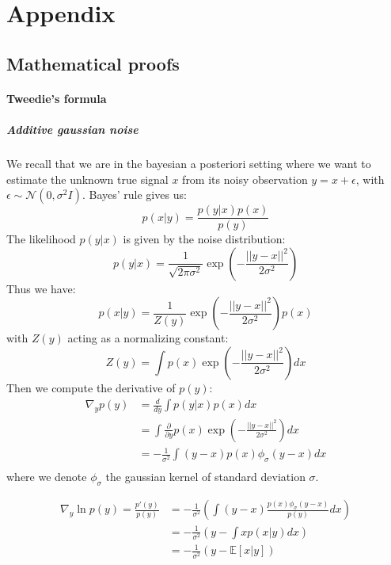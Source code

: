 \section{Appendix}

\subsection{Mathematical proofs}

\paragraph{Tweedie's formula}
\subparagraph{Additive gaussian noise}
We recall that we are in the bayesian a posteriori setting where we want to estimate the unknown true signal $x$ from its noisy observation $y = x + \epsilon$, with $\epsilon \sim \mathcal{N}(0, \sigma^2 I)$.
Bayes' rule gives us:
\begin{equation*}
    p(x|y) = \frac{p(y|x)p(x)}{p(y)}
\end{equation*}
The likelihood $p(y|x)$ is given by the noise distribution:
\begin{equation*}
    p(y|x) = \frac{1}{\sqrt{2 \pi \sigma^2}} \exp\left(-\frac{||y - x||^2}{2 \sigma^2}\right)
\end{equation*}
Thus we have:
\begin{equation*}
    p(x|y) = \frac{1}{Z(y)} \exp\left(-\frac{||y - x||^2}{2 \sigma^2}\right) p(x)
\end{equation*}
with $Z(y)$ acting as a normalizing constant:
\begin{equation*}
    Z(y) = \int p(x) \exp\left(-\frac{||y - x||^2}{2 \sigma^2}\right)dx
\end{equation*}
Then we compute the derivative of $p(y)$:
\begin{align*}
    \nabla_y p(y) &= \frac{d}{dy} \int p(y|x)p(x) dx \\
    &= \int \frac{\partial}{\partial y} p(x) \exp\left(-\frac{||y - x||^2}{2 \sigma^2}\right) dx \\
    &= - \frac{1}{\sigma^2} \int (y - x) p(x) \phi_{\sigma}(y - x) dx \\
\end{align*}
where we denote $\phi_{\sigma}$ the gaussian kernel of standard deviation $\sigma$.

\begin{align*}
    \nabla_y \ln p(y) = \frac{p'(y)}{p(y)} &= - \frac{1}{\sigma^2} \left( \int (y - x) \frac{p(x) \phi_{\sigma}(y - x)}{p(y)} dx \right) \\
    &= - \frac{1}{\sigma^2} \left( y - \int x p(x|y) dx \right) \\
    &= - \frac{1}{\sigma^2} (y - \mathbb{E}[x|y])
\end{align*}

